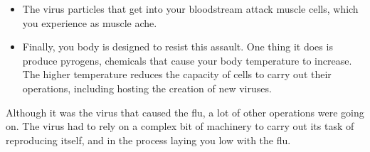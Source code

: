 \begin{refsection}
\begin{itemize}
\item The virus particles that get into your bloodstream attack muscle cells, which you experience as muscle ache.

\item Finally, you body is designed to resist this assault. One thing it does is produce pyrogens, chemicals that cause your body temperature to increase. The higher temperature reduces the capacity of cells to carry out their operations, including hosting the creation of new viruses.

\end{itemize}

Although it was the virus that caused the flu, a lot of other operations were going on. The virus had to rely on a complex bit of machinery to carry out its task of reproducing itself, and in the process laying you low with the flu.

\begin{marginfigure}
 \begin{center}


\end{center}
\end{marginfigure}
\end{refsection}
